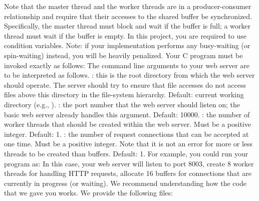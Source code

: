 {}Note that the master thread and the worker threads are in a producer-consumer relationship and require that their accesses to the shared buffer be synchronized. Specifically, the master thread must block and wait if the buffer is full; a worker thread must wait if the buffer is empty. In this project, you are required to use condition variables. Note: if your implementation performs any busy-waiting (or spin-waiting) instead, you will be heavily penalized.\markdownRendererInterblockSeparator
{}\markdownRendererInterblockSeparator
{}Your C program must be invoked exactly as follows:\markdownRendererInterblockSeparator
{}\markdownRendererInterblockSeparator
{}The command line arguments to your web server are to be interpreted as follows.\markdownRendererInterblockSeparator
{}\markdownRendererUlBeginTight
\markdownRendererUlItem {}: this is the root directory from which the web server should operate. The server should try to ensure that file accesses do not access files above this directory in the file-system hierarchy. Default: current working directory (e.g., ).\markdownRendererUlItemEnd 
\markdownRendererUlItem {}: the port number that the web server should listen on; the basic web server already handles this argument. Default: 10000.\markdownRendererUlItemEnd 
\markdownRendererUlItem {}: the number of worker threads that should be created within the web server. Must be a positive integer. Default: 1.\markdownRendererUlItemEnd 
\markdownRendererUlItem {}: the number of request connections that can be accepted at one time. Must be a positive integer. Note that it is not an error for more or less threads to be created than buffers. Default: 1.\markdownRendererUlItemEnd 
\markdownRendererUlEndTight \markdownRendererInterblockSeparator
{}For example, you could run your program as: \markdownRendererInterblockSeparator
{}In this case, your web server will listen to port 8003, create 8 worker threads for handling HTTP requests, allocate 16 buffers for connections that are currently in progress (or waiting).\markdownRendererInterblockSeparator
{}\markdownRendererInterblockSeparator
{}We recommend understanding how the code that we gave you works. We provide the following files:\markdownRendererInterblockSeparator
